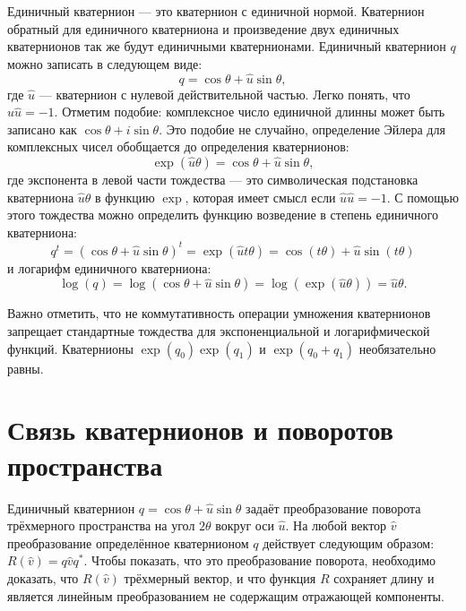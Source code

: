 \documentclass[draft]{article}
\begin{document}
Единичный кватернион — это кватернион с единичной нормой. Кватернион обратный для единичного кватерниона и произведение двух единичных кватернионов так же будут единичными кватернионами. Единичный кватернион $q$ можно записать в следующем виде: 
\begin{equation}
q = \cos\theta  + \widehat{u}\sin\theta ,
\end{equation}
где $\widehat{u}$ — кватернион с нулевой действительной частью. %
Легко понять, что 
$\widehat{u}\widehat{u} = -1$. Отметим подобие: комплексное число единичной длинны может быть записано как $\cos\theta  + i\sin\theta$. Это подобие не случайно, определение Эйлера для комплексных чисел обобщается до определения кватернионов:
\begin{equation}
\exp(\widehat{u}\theta) = \cos\theta  + \widehat{u}\sin\theta ,
\end{equation}
где экспонента в левой части тождества — это символическая подстановка кватерниона $\widehat{u}\theta$ в функцию $\exp$, которая имеет смысл если $\widehat{u}\widehat{u} = -1$. С помощью этого тождества можно определить функцию возведение в степень единичного кватерниона:
\begin{equation}
q^t = (\cos\theta  + \widehat{u}\sin\theta )^t = \exp(\widehat{u}t\theta) = \cos(t\theta) + \widehat{u}\sin(t\theta) 
\end{equation}
и логарифм единичного кватерниона:
\begin{equation}
\label{eq:12}
\log(q) = \log(\cos\theta  + \widehat{u}\sin\theta ) = \log(\exp(\widehat{u} \theta)) = \widehat{u} \theta .
\end{equation}

Важно отметить, что не коммутативность операции умножения кватернионов запрещает стандартные тождества для экспоненциальной и логарифмической функций. Кватернионы $\exp(q_0)\exp(q_1)$ и $\exp(q_0 + q_1)$ необязательно равны.

\section{Связь кватернионов и поворотов \\ пространства}

Единичный кватернион $q = \cos\theta  + \widehat{u}\sin\theta $ задаёт преобразование поворота трёхмерного пространства на угол $2\theta$ вокруг оси $\widehat{u}$. На любой вектор $\widehat{v}$ преобразование определённое кватернионом $q$ действует следующим образом: $R(\widehat{v}) = q\widehat{v}q^*$. Чтобы показать, что это преобразование поворота, необходимо доказать, что $R(\widehat{v})$ трёхмерный вектор, и что функция $R$ сохраняет длину и является линейным преобразованием не содержащим отражающей компоненты.
\end{document}
